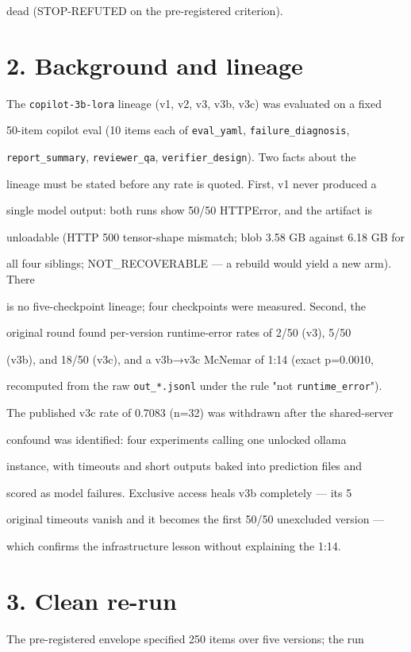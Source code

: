 \documentclass[11pt,a4paper]{article}
\begin{document}
dead (STOP-REFUTED on the pre-registered criterion).

\section*{2. Background and lineage}
The \texttt{copilot-3b-lora} lineage (v1, v2, v3, v3b, v3c) was evaluated on a fixed

50-item copilot eval (10 items each of \texttt{eval\_yaml}, \texttt{failure\_diagnosis},

\texttt{report\_summary}, \texttt{reviewer\_qa}, \texttt{verifier\_design}). Two facts about the

lineage must be stated before any rate is quoted. First, v1 never produced a

single model output: both runs show 50/50 HTTPError, and the artifact is

unloadable (HTTP 500 tensor-shape mismatch; blob 3.58 GB against 6.18 GB for

all four siblings; NOT\_RECOVERABLE — a rebuild would yield a new arm). There

is no five-checkpoint lineage; four checkpoints were measured. Second, the

original round found per-version runtime-error rates of 2/50 (v3), 5/50

(v3b), and 18/50 (v3c), and a v3b→v3c McNemar of 1:14 (exact p=0.0010,

recomputed from the raw \texttt{out\_*.jsonl} under the rule "not \texttt{runtime\_error}").

The published v3c rate of 0.7083 (n=32) was withdrawn after the shared-server

confound was identified: four experiments calling one unlocked ollama

instance, with timeouts and short outputs baked into prediction files and

scored as model failures. Exclusive access heals v3b completely — its 5

original timeouts vanish and it becomes the first 50/50 unexcluded version —

which confirms the infrastructure lesson without explaining the 1:14.

\section*{3. Clean re-run}
The pre-registered envelope specified 250 items over five versions; the run
\end{document}
